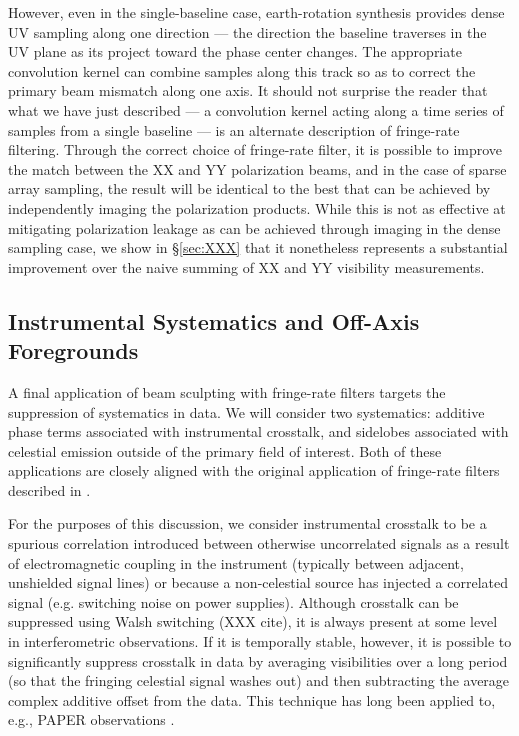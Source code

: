 \documentclass[twocolumn,apj,numberedappendix]{emulateapj}
\begin{document}
However, even in the single-baseline case, earth-rotation synthesis provides dense UV sampling along one direction --- the
direction the baseline traverses in the UV plane as its project toward the phase center changes.  The appropriate
convolution kernel can combine samples along this track so as to correct the primary beam mismatch along one axis.
It should not surprise the reader that what we have just described --- a convolution kernel acting along a time series
of samples from a single baseline --- is an alternate description of fringe-rate filtering.  Through the correct
choice of fringe-rate filter, it is possible to improve the match between the XX and YY polarization beams, and
in the case of sparse array sampling, the result will be identical to the best that can be achieved by independently
imaging the polarization products.  While this is not as effective at mitigating polarization leakage as can be achieved
through imaging in the dense sampling case, we show in \S\ref{sec:XXX} that it nonetheless represents a substantial improvement
over the naive summing of XX and YY visibility measurements.


\subsection{Instrumental Systematics and Off-Axis Foregrounds}
\label{sec:foregrounds}


A final application of beam sculpting with fringe-rate filters targets the suppression of systematics in data.
We will consider two systematics: additive phase terms associated with instrumental crosstalk, and sidelobes
associated with celestial emission outside of the primary field of interest.  Both of these applications are 
closely aligned with the original application of fringe-rate filters described in \citet{parsons_backer2009}.

For the purposes of this discussion, we consider instrumental crosstalk to be a spurious 
correlation introduced between otherwise uncorrelated signals
as a result of electromagnetic coupling in the instrument (typically between adjacent, unshielded signal lines)
or because a non-celestial source has injected a correlated signal (e.g. switching noise on power supplies).
Although crosstalk can be suppressed using Walsh switching (XXX cite), it is always present at some level
in interferometric observations.  If it is temporally stable, however, it is possible to significantly
suppress crosstalk in data by averaging visibilities over a long period (so that the fringing celestial
signal washes out) and then subtracting the average complex additive offset from the data.  This 
technique has
long been applied to, e.g., PAPER observations \citep{parsons_et_al2010,jacobs_et_al,pober_et_al,parsons_et_al2014}.
\end{document}
